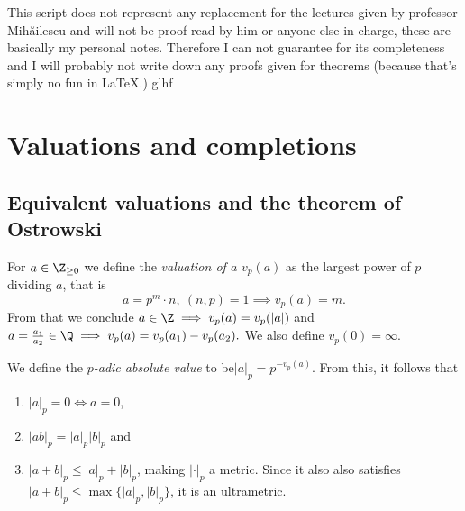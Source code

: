 \documentclass{jvfscript}
\begin{document}
	\frontmatter
	\maketitle
	
\tableofcontents
\newpage
\thispagestyle{plain}
This script does not represent any replacement for the lectures given by professor Mih\u{a}ilescu and will not be proof-read by him or anyone else in charge, these are basically my personal notes. Therefore I can not guarantee for its completeness and I will probably not write down any proofs given for theorems (because that's simply no fun in \LaTeX.)\hspace{\fill} glhf
\newpage
\mainmatter	
{}			%


\addtocounter{chapter}{2}
\chapter{Valuations and completions}

	\section{Equivalent valuations and the theorem of Ostrowski}
	
	\begin{defn}[Valuation]
		For $a \in \Z_{\geq 0}$ we define the \emph{valuation of $a$} $v_p(a)$ as the largest power of $p$ dividing $a$, that is
		\[ a = p^m \cdot n,\ (n,p) = 1 \implies v_p(a) = m. \]
		From that we conclude $ a \in \Z \implies v_p(a) = v_p(|a|) $ and $ a = \frac{a_1}{a_2} \in \Q \implies v_p(a) = v_p(a_1) - v_p(a_2). $ We also define $ v_p(0) = \infty $.
	\end{defn}
	
	\begin{defn}
		We define the \emph{$p$-adic absolute value} to be$ |a|_p = p^{-v_p(a)} $. From this, it follows that
		\begin{enumerate}
			\item $|a|_p = 0 \iff a = 0$,
			\item $ |ab|_p = |a|_p |b|_p $ and
			\item $|a+b|_p \leq |a|_p+|b|_p$, making $|\cdot|_p$ a metric. Since it also also satisfies $|a+b|_p \leq \max\{|a|_p,|b|_p\}$, it is an ultrametric.
		\end{enumerate}
	\end{defn}
\end{document}
